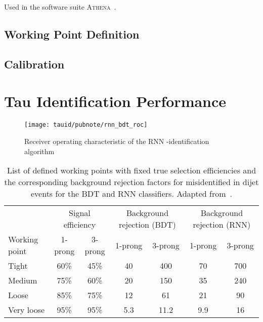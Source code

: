 Used in the software suite
\textsc{Athena}~\cite{ATL-SOFT-PUB-2021-001}.

\subsection{Working Point Definition}


\subsection{Calibration}


\section{Tau Identification Performance}
\label{sec:tauid_perf}

\begin{figure}[htbp]
  \centering

  \texttt{[image: tauid/pubnote/rnn\_bdt\_roc]}

  \caption{Receiver operating characteristic of the RNN
    \tauhad-identification algorithm \cite{ATL-PHYS-PUB-2019-033}}
  \label{fig:tauid_rnn_bdt_roc_comparison}
\end{figure}


\begin{table}
  \centering

  \caption{List of defined working points with fixed true \tauhadvis
    selection efficiencies and the corresponding background rejection
    factors for misidentified \tauhadvis in dijet events for the BDT
    and RNN classifiers. Adapted from~\cite{ATL-PHYS-PUB-2019-033}.}%
  \label{tab:rnn_wps}

  \begin{tabular}{lcccccc}
    \toprule
                  & \multicolumn{2}{c}{Signal efficiency} & \multicolumn{2}{c}{Background rejection (BDT)} & \multicolumn{2}{c}{Background rejection (RNN)} \\
    Working point  & 1-prong & 3-prong & 1-prong & 3-prong & 1-prong & 3-prong \\
    \midrule
    Tight          & 60\%    & 45\%    & 40      & 400  & 70   & 700 \\
    Medium         & 75\%    & 60\%    & 20      & 150  & 35   & 240 \\
    Loose          & 85\%    & 75\%    & 12      & 61   & 21   & 90  \\
    Very loose     & 95\%    & 95\%    & 5.3     & 11.2 & 9.9  & 16  \\
    \bottomrule
  \end{tabular}
\end{table}

